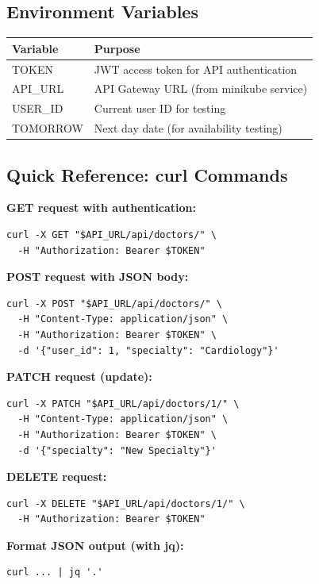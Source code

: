 \documentclass[12pt,a4paper]{article}
\begin{document}
\subsection{Environment Variables}

\begin{table}[h]
\centering
\small
\begin{tabular}{@{}ll@{}}
\toprule
\textbf{Variable} & \textbf{Purpose} \\
\midrule
TOKEN & JWT access token for API authentication \\
API\_URL & API Gateway URL (from minikube service) \\
USER\_ID & Current user ID for testing \\
TOMORROW & Next day date (for availability testing) \\
\bottomrule
\end{tabular}
\end{table}

\subsection{Quick Reference: curl Commands}

\textbf{GET request with authentication:}
\begin{lstlisting}[style=bash]
curl -X GET "$API_URL/api/doctors/" \
  -H "Authorization: Bearer $TOKEN"
\end{lstlisting}

\textbf{POST request with JSON body:}
\begin{lstlisting}[style=bash]
curl -X POST "$API_URL/api/doctors/" \
  -H "Content-Type: application/json" \
  -H "Authorization: Bearer $TOKEN" \
  -d '{"user_id": 1, "specialty": "Cardiology"}'
\end{lstlisting}

\textbf{PATCH request (update):}
\begin{lstlisting}[style=bash]
curl -X PATCH "$API_URL/api/doctors/1/" \
  -H "Content-Type: application/json" \
  -H "Authorization: Bearer $TOKEN" \
  -d '{"specialty": "New Specialty"}'
\end{lstlisting}

\textbf{DELETE request:}
\begin{lstlisting}[style=bash]
curl -X DELETE "$API_URL/api/doctors/1/" \
  -H "Authorization: Bearer $TOKEN"
\end{lstlisting}

\textbf{Format JSON output (with jq):}
\begin{lstlisting}[style=bash]
curl ... | jq '.'
\end{lstlisting}
\end{document}
